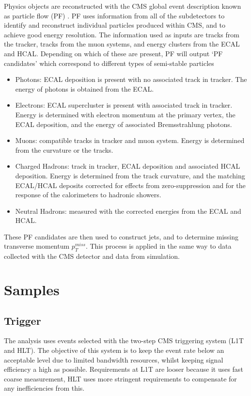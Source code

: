 Physics objects are reconstructed with the CMS global event description known as particle flow (PF) \cite{ParticleFlow}.
PF uses information from all of the subdetectors to identify and reconstruct individual particles produced within CMS, and to achieve good energy resolution.
The information used as inputs are tracks from the tracker, tracks from the muon systems, and energy clusters from the ECAL and HCAL. Depending on which of these are present, PF will output `PF candidates' which correspond to different types of semi-stable particles 
\begin{itemize}[leftmargin=.5in,noitemsep]
    \item Photons: ECAL deposition is present with no associated track in tracker. The energy of photons is obtained from the ECAL. 
    \item Electrons: ECAL supercluster is present with associated track in tracker. Energy is determined with electron momentum at the primary vertex, the ECAL deposition, and the energy of associated Bremsstrahlung photons. 
    \item Muons: compatible tracks in tracker and muon system. Energy is determined from the curvature or the tracks. 
    \item Charged Hadrons: track in tracker, ECAL deposition and associated HCAL deposition. Energy is determined from the track curvature, and the matching ECAL/HCAL deposits corrected for effects from zero-suppression and for the response of the calorimeters to hadronic showers.
    \item Neutral Hadrons: measured with the corrected energies from the ECAL and HCAL. 
\end{itemize}
These PF candidates are then used to construct jets, and to determine missing transverse momentum $p_{T}^{miss}$.
This process is applied in the same way to data collected with the CMS detector and data from simulation.


\section{Samples}

\subsection{Trigger}
The analysis uses events selected with the two-step CMS triggering system (L1T and HLT). The objective of this system is to keep the event rate below an acceptable level due to limited bandwidth resources, whilst keeping signal efficiency a high as possible. Requirements at L1T are looser because it uses fast coarse measurement, HLT uses more stringent requirements to compensate for any inefficiencies from this. 

